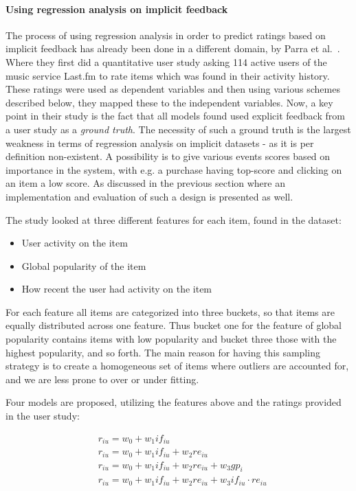 \paragraph{Using regression analysis on implicit feedback}
The process of using regression analysis in order to predict ratings based on
implicit feedback has already been done in a different domain, by Parra et
al.~\cite{parra2011walk}. Where they first did a quantitative user study
asking 114 active users of the music service Last.fm to rate items which was
found in their activity history. These ratings were used as dependent variables
and then using various schemes described below, they mapped these to the
independent variables. Now, a key point in their study is the fact that all
models found used explicit feedback from a user study as a \textit{ground
truth}. The necessity of such a ground truth is the largest weakness in terms
of regression analysis on implicit datasets - as it is per definition
non-existent. A possibility is to give various events scores based on
importance in the system, with e.g. a purchase having top-score and clicking on
an item a low score. As discussed in the previous section where an
implementation and evaluation of such a design is presented as well.

The study looked at three different features for each item, found in the
dataset:

\begin{itemize}
  \item User activity on the item
  \item Global popularity of the item
  \item How recent the user had activity on the item
\end{itemize}

For each feature all items are categorized into three buckets, so that items
are equally distributed across one feature. Thus bucket one for the feature of
global popularity contains items with low popularity and bucket three those
with the highest popularity, and so forth. The main reason for having this
sampling strategy is to create a homogeneous set of items where outliers are
accounted for, and we are less prone to over or under fitting.

Four models are proposed, utilizing the features above and the ratings provided
in the user study:

\begin{equation}
  \begin{aligned}
    & r_{iu} = w_0 + w_1 if_{iu} \\
    & r_{iu} = w_0 + w_1 if_{iu} + w_2 re_{iu} \\
    & r_{iu} = w_0 + w_1 if_{iu} + w_2 re_{iu} + w_3 gp_{i} \\
    & r_{iu} = w_0 + w_1 if_{iu} + w_2 re_{iu} + w_3 if_{iu} \cdot re_{iu}
  \end{aligned}
\end{equation}

